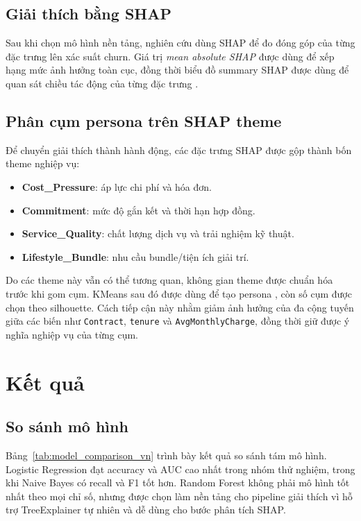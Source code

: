 ﻿\documentclass[conference]{IEEEtran}
\begin{document}
\subsection{Giải thích bằng SHAP}
Sau khi chọn mô hình nền tảng, nghiên cứu dùng SHAP để đo đóng góp của từng đặc trưng lên xác suất churn. Giá trị \emph{mean absolute SHAP} được dùng để xếp hạng mức ảnh hưởng toàn cục, đồng thời biểu đồ summary SHAP được dùng để quan sát chiều tác động của từng đặc trưng \cite{lundberg2017unified}.

\subsection{Phân cụm persona trên SHAP theme}
Để chuyển giải thích thành hành động, các đặc trưng SHAP được gộp thành bốn theme nghiệp vụ:
\begin{itemize}[leftmargin=*]
    \item \textbf{Cost\_Pressure}: áp lực chi phí và hóa đơn.
    \item \textbf{Commitment}: mức độ gắn kết và thời hạn hợp đồng.
    \item \textbf{Service\_Quality}: chất lượng dịch vụ và trải nghiệm kỹ thuật.
    \item \textbf{Lifestyle\_Bundle}: nhu cầu bundle/tiện ích giải trí.
\end{itemize}

Do các theme này vẫn có thể tương quan, không gian theme được chuẩn hóa trước khi gom cụm. KMeans sau đó được dùng để tạo persona \cite{macqueen1967some}, còn số cụm được chọn theo silhouette. Cách tiếp cận này nhằm giảm ảnh hưởng của đa cộng tuyến giữa các biến như \texttt{Contract}, \texttt{tenure} và \texttt{AvgMonthlyCharge}, đồng thời giữ được ý nghĩa nghiệp vụ của từng cụm.

\section{Kết quả}
\subsection{So sánh mô hình}
Bảng~\ref{tab:model_comparison_vn} trình bày kết quả so sánh tám mô hình. Logistic Regression đạt accuracy và AUC cao nhất trong nhóm thử nghiệm, trong khi Naive Bayes có recall và F1 tốt hơn. Random Forest không phải mô hình tốt nhất theo mọi chỉ số, nhưng được chọn làm nền tảng cho pipeline giải thích vì hỗ trợ TreeExplainer tự nhiên và dễ dùng cho bước phân tích SHAP.
\end{document}
